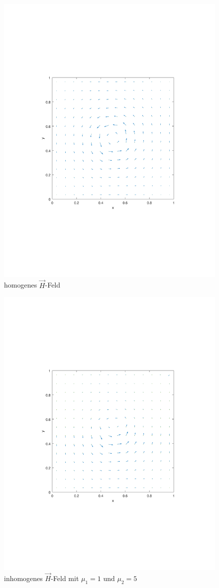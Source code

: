 \documentclass[Protokollheft.tex]{subfiles}
\begin{document}
\begin{figure}[hb]
	\centering
	\includegraphics[width=0.8\linewidth]{homoFeld.pdf}
	\caption{homogenes $\vec{H}$-Feld  }
	\label{fig:homfeld}
\end{figure}

\begin{figure}[hb]
	\centering
	\includegraphics[width=0.8\linewidth]{inhomoFeld.pdf}
	\caption{inhomogenes $\vec{H}$-Feld mit $\mu_1=1$ und $\mu_2=5$   }
	\label{fig:inhomfeld}
\end{figure}
\end{document}

